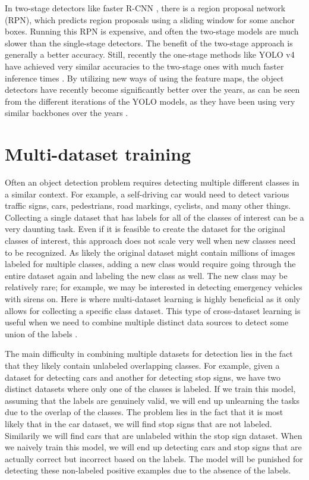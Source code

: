 In two-stage detectors like faster R-CNN \citep{faster-rcnn}, there is a region proposal network (RPN), which predicts region proposals using a sliding window for some anchor boxes.
Running this RPN is expensive, and often the two-stage models are much slower than the single-stage detectors.
The benefit of the two-stage approach is generally a better accuracy. 
Still, recently the one-stage methods like YOLO v4 have achieved very similar accuracies to the two-stage ones with much faster inference times \citep{yolov4}.
By utilizing new ways of using the feature maps, the object detectors have recently become significantly better over the years, as can be seen from the different iterations of the YOLO models, as they have been using very similar backbones over the years \citep{yolov4}.

\section{Multi-dataset training}
Often an object detection problem requires detecting multiple different classes in a similar context.
For example, a self-driving car would need to detect various traffic signs, cars, pedestrians, road markings, cyclists, and many other things.
Collecting a single dataset that has labels for all of the classes of interest can be a very daunting task.
Even if it is feasible to create the dataset for the original classes of interest, this approach does not scale very well when new classes need to be recognized.
As likely the original dataset might contain millions of images labeled for multiple classes, adding a new class would require going through the entire dataset again and labeling the new class as well.
The new class may be relatively rare; for example, we may be interested in detecting emergency vehicles with sirens on.
Here is where multi-dataset learning is highly beneficial as it only allows for collecting a specific class dataset.
This type of cross-dataset learning is useful when we need to combine multiple distinct data sources to detect some union of the labels \citep{cross_data}.

The main difficulty in combining multiple datasets for detection lies in the fact that they likely contain unlabeled overlapping classes.
For example, given a dataset for detecting cars and another for detecting stop signs, we have two distinct datasets where only one of the classes is labeled.
If we train this model, assuming that the labels are genuinely valid, we will end up unlearning the tasks due to the overlap of the classes.
The problem lies in the fact that it is most likely that in the car dataset, we will find stop signs that are not labeled.
Similarily we will find cars that are unlabeled within the stop sign dataset.
When we naively train this model, we will end up detecting cars and stop signs that are actually correct but incorrect based on the labels.
The model will be punished for detecting these non-labeled positive examples due to the absence of the labels.

